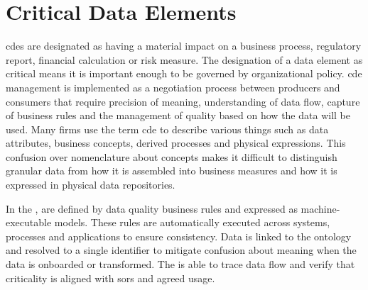 \section{Critical Data Elements}\label{sec:ekgmm-b-4-5} %

\Glspl{cde} are designated as having a material impact on a business process, regulatory report,
financial calculation or risk measure.
The designation of a data element as critical means it is important enough to be governed by organizational policy.
\Gls{cde} management is implemented as a negotiation process between producers and consumers that require
precision of meaning, understanding of data flow, capture of business rules and the management of quality based on
how the data will be used.
Many firms use the term \gls{cde} to describe various things such as data attributes, business concepts,
derived processes and physical expressions.
This confusion over nomenclature about concepts makes it difficult to distinguish granular data from how it is
assembled into business measures and how it is expressed in physical data repositories.

\ekgmmContextSection

In the ,
 are defined by data quality business rules and expressed as
machine-executable models.
These rules are automatically executed across systems, processes and applications to ensure consistency.
Data is linked to the ontology and resolved to a single identifier to mitigate confusion about meaning when the
data is onboarded or transformed.
The  is able to trace data flow and verify that criticality is aligned with \glspl{sor}
and agreed usage.

